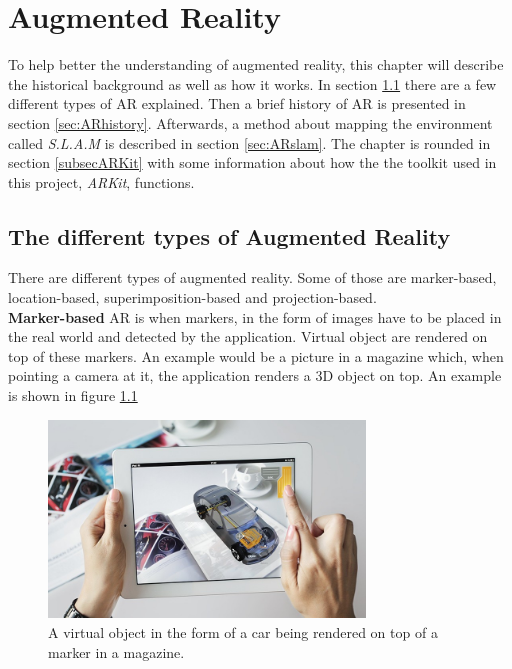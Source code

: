\chapter{Augmented Reality}

To help better the understanding of augmented reality, this chapter will describe the historical background as well as how it works. In section \ref{sec:ARtype} there
are a few different types of AR explained. Then a brief history of AR is presented in section \ref{sec:ARhistory}. Afterwards, a method about mapping the environment called \textit{S.L.A.M} is described in section \ref{sec:ARslam}. The chapter is rounded in section \ref{subsecARKit} with some information about how the the toolkit used in this project, \textit{ARKit}, functions. 

\section{The different types of Augmented Reality}
\label{sec:ARtype}
There are different types of augmented reality. Some of those are marker-based, location-based, superimposition-based and projection-based. \\

\textbf{Marker-based} AR is when markers, in the form of images have to be placed in the real world and detected by the application. Virtual object are rendered on top of these markers. An example would be a picture in a magazine which, when pointing a camera at it, the application renders a 3D object on top. An example is shown in figure \ref{fig:marker-based-ar} \\

\begin{figure}[hbtp]
\begin{center}
\includegraphics[width = 0.75\textwidth]{./Images/markerbasedar.jpg} 
\caption{A virtual object in the form of a car being rendered on top of a marker in a magazine.}
\label{fig:marker-based-ar}
\end{center}
\end{figure}

